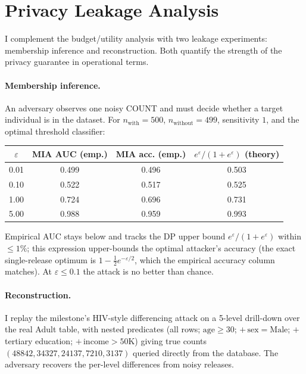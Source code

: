 \documentclass[sigconf,nonacm]{acmart}
\newcommand{\eps}{\varepsilon}
\begin{document}
\section{Privacy Leakage Analysis}
\label{sec:leakage}

I complement the budget/utility analysis with two leakage experiments: membership inference and reconstruction. Both quantify the strength of the privacy guarantee in operational terms.

\paragraph{Membership inference.} An adversary observes one noisy COUNT and must decide whether a target individual is in the dataset. For $n_{\mathrm{with}} = 500$, $n_{\mathrm{without}} = 499$, sensitivity $1$, and the optimal threshold classifier:

\begin{center}
\small
\begin{tabular}{c|cc|c}
\toprule
$\eps$ & MIA AUC (emp.) & MIA acc. (emp.) & $e^\eps/(1+e^\eps)$ (theory) \\
\midrule
0.01 & 0.499 & 0.496 & 0.503 \\
0.10 & 0.522 & 0.517 & 0.525 \\
1.00 & 0.724 & 0.696 & 0.731 \\
5.00 & 0.988 & 0.959 & 0.993 \\
\bottomrule
\end{tabular}
\end{center}

Empirical AUC stays below and tracks the DP upper bound $e^\eps/(1+e^\eps)$ within $\leq 1\%$; this expression upper-bounds the optimal attacker's accuracy (the exact single-release optimum is $1-\tfrac12 e^{-\eps/2}$, which the empirical accuracy column matches). At $\eps\leq 0.1$ the attack is no better than chance.

\paragraph{Reconstruction.} I replay the milestone's HIV-style differencing attack on a 5-level drill-down over the real Adult table, with nested predicates (all rows; $\mathrm{age}\ge30$; $+\,\mathrm{sex{=}Male}$; $+\,$tertiary education; $+\,\mathrm{income{>}50K}$) giving true counts $(48842, 34327, 24137, 7210, 3137)$ queried directly from the database. The adversary recovers the per-level differences from noisy releases.
\end{document}
